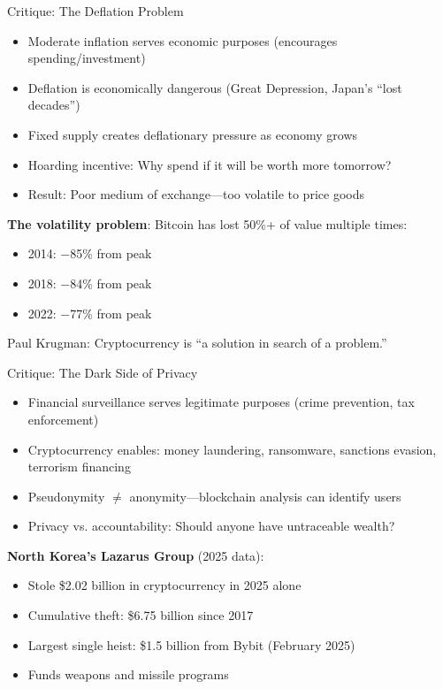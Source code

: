 ﻿\documentclass[aspectratio=169,11pt]{beamer}
\begin{document}
\begin{frame}{Critique: The Deflation Problem}
\begin{objectionbox}
\begin{itemize}
    \item Moderate inflation serves economic purposes (encourages spending/investment)
    \item Deflation is economically dangerous (Great Depression, Japan's ``lost decades'')
    \item Fixed supply creates deflationary pressure as economy grows
    \item Hoarding incentive: Why spend if it will be worth more tomorrow?
    \item Result: Poor medium of exchange---too volatile to price goods
\end{itemize}
\end{objectionbox}

\vspace{0.3em}
\textbf{The volatility problem}: Bitcoin has lost 50\%+ of value multiple times:
\begin{itemize}
    \item 2014: $-$85\% from peak
    \item 2018: $-$84\% from peak  
    \item 2022: $-$77\% from peak
\end{itemize}

Paul Krugman: Cryptocurrency is ``a solution in search of a problem.''
\end{frame}

\begin{frame}{Critique: The Dark Side of Privacy}
\begin{objectionbox}
\begin{itemize}
    \item Financial surveillance serves legitimate purposes (crime prevention, tax enforcement)
    \item Cryptocurrency enables: money laundering, ransomware, sanctions evasion, terrorism financing
    \item Pseudonymity $\neq$ anonymity---blockchain analysis can identify users
    \item Privacy vs. accountability: Should anyone have untraceable wealth?
\end{itemize}
\end{objectionbox}

\vspace{0.3em}
\textbf{North Korea's Lazarus Group} (2025 data):
\begin{itemize}
    \item Stole \$2.02 billion in cryptocurrency in 2025 alone
    \item Cumulative theft: \$6.75 billion since 2017
    \item Largest single heist: \$1.5 billion from Bybit (February 2025)
    \item Funds weapons and missile programs
\end{itemize}
\end{frame}
\end{document}
